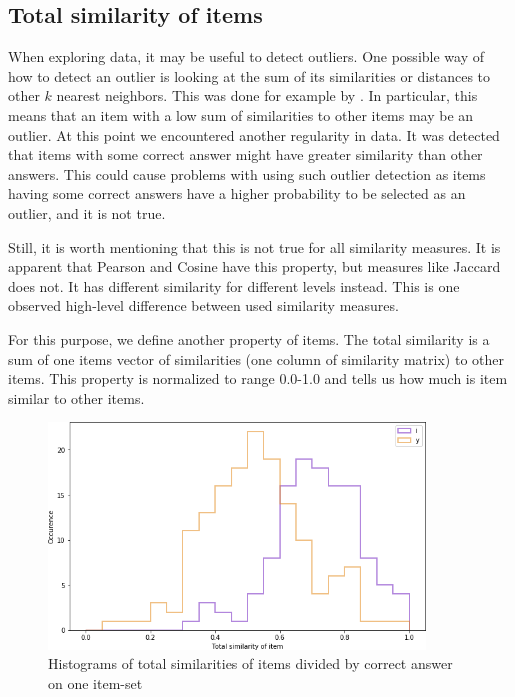 \documentclass[
  digital, %
  table,   %
  nolof,     %
  nolot,     %
  nocover,
  color,
  final, %
]{fithesis3}
\begin{document}

\subsection{Total similarity of items}\label{total-similarity-of-items}

When exploring data, it may be useful to detect outliers. One possible way of how to detect an outlier is looking at the sum of its similarities or distances to other $k$ nearest neighbors. This was done for example by \citeauthor{zhang2006detecting}\cite{zhang2006detecting}. In particular, this means that an item with a low sum of similarities to other items may be an outlier. At this point we encountered another regularity in data. It was detected that items with some correct answer might have greater similarity than other answers. This could cause problems with using such outlier detection as items having some correct answers have a higher probability to be selected as an outlier, and it is not true.

Still, it is worth mentioning that this is not true for all similarity measures. It is apparent that Pearson and Cosine have this property, but measures like Jaccard does not. It has different similarity for different levels instead. This is one observed high-level difference between used similarity measures.


For this purpose, we define another property of items. The total similarity is a sum of one items vector of similarities (one column of similarity matrix) to other items. This property is normalized to range 0.0-1.0 and tells us how much is item similar to other items.

\begin{figure}
  \includegraphics[width=10cm]{img/histogram_i_y}
  \caption{Histograms of total similarities of items divided by correct answer on one item-set}
  \label{fig:histogram_i_y}
\end{figure}
\end{document}
